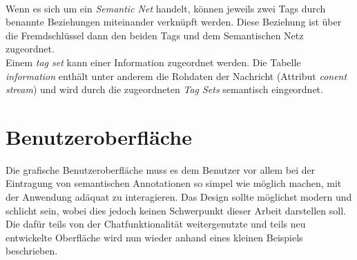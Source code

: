 \\Wenn es sich um ein \textit{Semantic Net} handelt, können jeweils zwei Tags durch benannte Beziehungen miteinander verknüpft werden. Diese Beziehung ist über die Fremdschlüssel dann den beiden Tags und dem Semantischen Netz zugeordnet. 
\\Einem \textit{tag set} kann einer Information zugeordnet werden. Die Tabelle \textit{information} enthält unter anderem die Rohdaten der Nachricht (Attribut \textit{conent stream}) und wird durch die zugeordneten \textit{Tag Sets} semantisch eingeordnet. 
\newline [...]

\section{Benutzeroberfläche}
Die grafische Benutzeroberfläche muss es dem Benutzer vor allem bei der Eintragung von semantischen Annotationen so simpel wie möglich machen, mit der Anwendung adäquat zu interagieren. Das Design sollte möglichst modern und schlicht sein, wobei dies jedoch keinen Schwerpunkt dieser Arbeit darstellen soll. 
\\Die dafür teils von der Chatfunktionalität weitergenutzte und teils neu entwickelte Oberfläche wird nun wieder anhand eines kleinen Beispiels beschrieben. 
